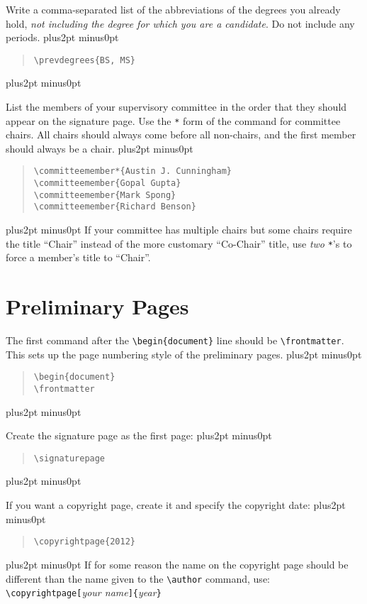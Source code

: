 \documentclass[doublespacing]{utdthesis}
\newenvironment{exampleclasscode}
 {\parindent=1cm\vskip0pt plus2pt minus0pt\begin{verse}}
 {\end{verse}\vskip0pt plus2pt minus0pt}
\begin{document}
Write a comma-separated list of the abbreviations of the degrees you already
hold, \emph{not including the degree for which you are a candidate}.
Do not include any periods.
\begin{exampleclasscode}
\verb|\prevdegrees{BS, MS}|
\end{exampleclasscode}

List the members of your supervisory committee in the order that they should
appear on the signature page.
Use the \texttt{*} form of the command for committee chairs.
All chairs should always come before all non-chairs, and the first member
should always be a chair.
\begin{exampleclasscode}
\verb|\committeemember*{Austin J. Cunningham}| \\
\verb|\committeemember{Gopal Gupta}| \\
\verb|\committeemember{Mark Spong}| \\
\verb|\committeemember{Richard Benson}|
\end{exampleclasscode}
If your committee has multiple chairs but some chairs require the title
``Chair'' instead of the more customary ``Co-Chair'' title,
use \emph{two} \texttt{*}'s to force a member's title to ``Chair''.

\section{Preliminary Pages}
\label{s:prelim}

The first command after the \verb|\begin{document}| line should be
\verb|\frontmatter|.
This sets up the page numbering style of the preliminary pages.
\begin{exampleclasscode}
\verb|\begin{document}| \\
\verb|\frontmatter|
\end{exampleclasscode}

Create the signature page as the first page:
\begin{exampleclasscode}
\verb|\signaturepage|
\end{exampleclasscode}

If you want a copyright page, create it and specify the copyright date:
\begin{exampleclasscode}
\verb|\copyrightpage{2012}|
\end{exampleclasscode}
If for some reason the name on the copyright page should be different than
the name given to the \verb|\author| command, use:
\verb|\copyrightpage[|\textit{your name}\verb|]{|\textit{year}\verb|}|
\end{document}

